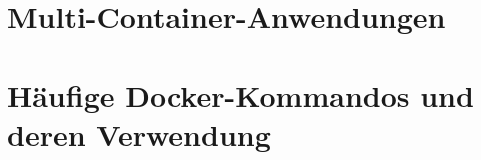 
\section{Multi-Container-Anwendungen} %
\label{sec:docker-multi-container-anwendungen}
\section{Häufige Docker-Kommandos und deren Verwendung}
\label{docker-verwendung}
